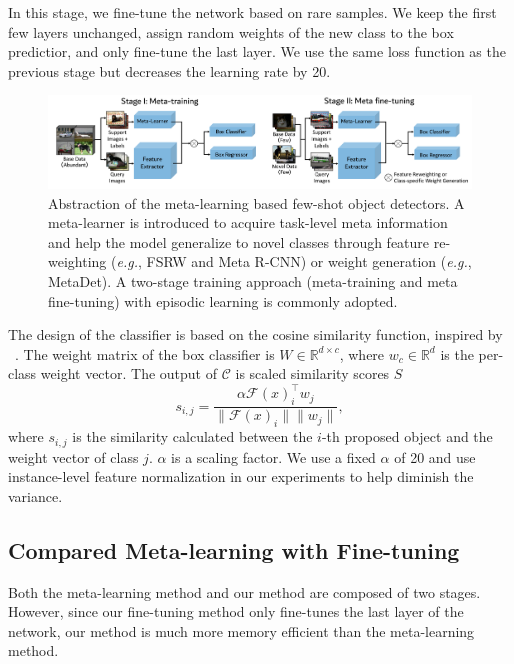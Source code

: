  In this stage, we fine-tune the network based on rare samples. We keep the first few layers unchanged, assign random weights of the new class to the box predictior, and only fine-tune the last layer. We use the same loss function as the previous stage but decreases the learning rate by 20.

\begin{figure}[ht]
    \centering
    \includegraphics[width=\linewidth]{figs/TFA_fig2.pdf}
    \vspace{-8mm}
    \caption{Abstraction of the meta-learning based few-shot object detectors. A meta-learner is introduced to acquire task-level meta information and help the model generalize to novel classes through feature re-weighting (\textit{e.g.}, FSRW and Meta R-CNN) or weight generation (\textit{e.g.}, MetaDet). A two-stage training approach (meta-training and meta fine-tuning) with episodic learning is commonly adopted.}
    \label{fig:meta_arch}
\end{figure}

 The design of the classifier is based on the cosine similarity function, inspired by ~\citet{gidaris2018dynamic,qi2018low,chen2019closer}.
The weight matrix of the box classifier is $W\in\mathbb{R}^{d\times c}$, where $w_c\in\mathbb{R}^d$ is the per-class weight vector. The output of $\mathcal{C}$ is scaled similarity scores $S$
\begin{equation}
    s_{i,j} = \frac{\alpha \mathcal{F}(x)_i^\top w_j}{\|\mathcal{F}(x)_i\| \|w_j\|},
    \label{eq:classifier} 
\end{equation}
where $s_{i,j}$ is the similarity calculated between the $i$-th proposed object and the weight vector of class $j$. $\alpha$ is a scaling factor. We use a fixed $\alpha$ of 20 and use instance-level feature normalization in our experiments to help diminish the variance.

\subsection{Compared Meta-learning with Fine-tuning}
\label{sec:meta}
Both the meta-learning method and our method are composed of two stages. However, since our fine-tuning method only fine-tunes the last layer of the network, our method is much more memory efficient than the meta-learning method.
